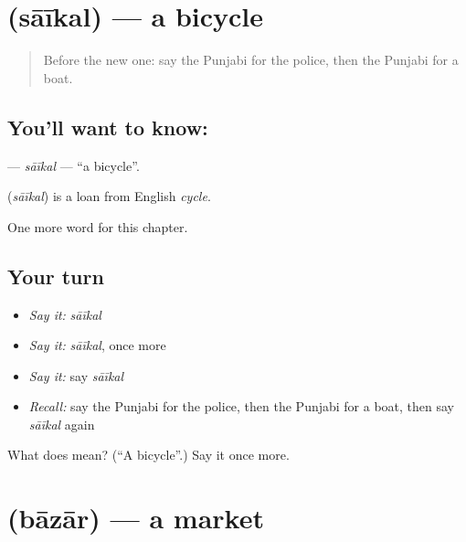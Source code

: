 \section[\texorpdfstring{\pa{ਸਾਈਕਲ} (sāīkal)}{ਸਾਈਕਲ (sāīkal)}]{ (sāīkal) — a bicycle}

\label{lesson:PA-C92-saikal}



\begin{quote}
Before the new one: say the Punjabi for the police, then the Punjabi for a boat.
\end{quote}

\subsection*{You'll want to know: }
\textbf{} — \emph{sāīkal} — \textquotedblleft{}a bicycle\textquotedblright{}.

\begin{cousinweb}
\textbf{} (\emph{sāīkal}) is a loan from English \emph{cycle}.
\end{cousinweb}

\begin{grammarlens}[title={What you've built}]
One more word for this chapter.
\end{grammarlens}

\subsection*{Your turn}
\begin{itemize}
\raggedright
  \item \emph{Say it:} \emph{sāīkal}
  \item \emph{Say it:} \emph{sāīkal}, once more
  \item \emph{Say it:} say \emph{sāīkal}
  \item \emph{Recall:} say the Punjabi for the police, then the Punjabi for a boat, then say \emph{sāīkal} again
\end{itemize}

\begin{tcolorbox}[breakable,colback=teal!4,colframe=teal!35!black,title={Before you move on}]
What does  mean? (\textquotedblleft{}A bicycle\textquotedblright{}.) Say it once more.
\end{tcolorbox}
\section[\texorpdfstring{\pa{ਬਾਜ਼ਾਰ} (bāzār)}{ਬਾਜ਼ਾਰ (bāzār)}]{ (bāzār) — a market}

